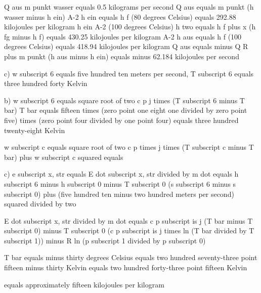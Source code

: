 Q aus 
m punkt wasser equals 0.5 kilograms per second
Q aus equals m punkt (h wasser minus h ein)
A-2 h ein equals h f (80 degrees Celsius) equals 292.88 kilojoules per kilogram
h ein
A-2 (100 degrees Celsius) h two equals h f plus x (h fg minus h f) equals 430.25 kilojoules per kilogram
A-2 h aus equals h f (100 degrees Celsius) equals 418.94 kilojoules per kilogram
Q aus equals minus Q R plus m punkt (h aus minus h ein) equals minus 62.184 kilojoules per second

c) w subscript 6 equals five hundred ten meters per second, T subscript 6 equals three hundred forty Kelvin

b) w subscript 6 equals square root of two c p j times (T subscript 6 minus T bar) T bar equals fifteen times (zero point one eight one divided by zero point five) times (zero point four divided by one point four) equals three hundred twenty-eight Kelvin

w subscript c equals square root of two c p times j times (T subscript c minus T bar) plus w subscript c squared equals

c) e subscript x, str equals E dot subscript x, str divided by m dot equals h subscript 6 minus h subscript 0 minus T subscript 0 (s subscript 6 minus s subscript 0) plus (five hundred ten minus two hundred meters per second) squared divided by two

E dot subscript x, str divided by m dot equals c p subscript is j (T bar minus T subscript 0) minus T subscript 0 (c p subscript is j times ln (T bar divided by T subscript 1)) minus R ln (p subscript 1 divided by p subscript 0)

T bar equals minus thirty degrees Celsius equals two hundred seventy-three point fifteen minus thirty Kelvin equals two hundred forty-three point fifteen Kelvin

equals approximately fifteen kilojoules per kilogram